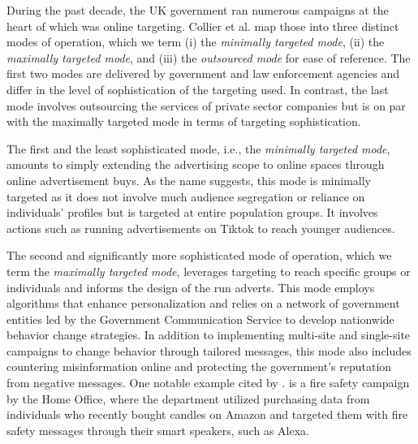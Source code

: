 \documentclass[preprint]{acmart}
\begin{document}
During the past decade, the UK government ran numerous campaigns at the heart of which was online targeting. Collier et al. \cite{Collier2022} map those into three distinct modes of operation, which we term (i) the \textit{minimally targeted mode}, (ii) the \textit{maximally targeted mode}, and (iii) the \textit{outsourced mode} for ease of reference. The first two modes are delivered by government and law enforcement agencies and differ in the level of sophistication of the targeting used. In contrast, the last mode involves outsourcing the services of private sector companies but is on par with the maximally targeted mode in terms of targeting sophistication.

The first and the least sophisticated mode, i.e., the \textit{minimally targeted mode}, amounts to simply extending the advertising scope to online spaces through online advertisement buys. As the name suggests, this mode is minimally targeted as it does not involve much audience segregation or reliance on individuals' profiles but is targeted at entire population groups. It involves actions such as running advertisements on Tiktok to reach younger audiences. 


The second and significantly more sophisticated mode of operation, which we term the \textit{maximally targeted mode}, leverages targeting to reach specific groups or individuals and informs the design of the run adverts. This mode employs algorithms that enhance personalization and relies on a network of government entities led by the Government Communication Service to develop nationwide behavior change strategies. In addition to implementing multi-site and single-site campaigns to change behavior through tailored messages, this mode also includes countering misinformation online and protecting the government's reputation from negative messages. One notable example cited by \citet[p.7]{Collier2022}. is a fire safety campaign by the Home Office, where the department utilized purchasing data from individuals who recently bought candles on Amazon and targeted them with fire safety messages through their smart speakers, such as Alexa.
\end{document}
